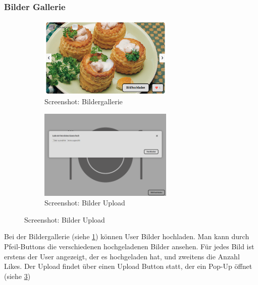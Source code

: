 \subsubsection*{Bilder Gallerie}

\begin{figure}[htp]
    \begin{subfigure}[b]{0.5\textwidth}
        \centering
        \includegraphics[width=0.7\textwidth]{images/Resultate_Bildergallerie.png}
        \caption{Screenshot: Bildergallerie}
        \label{fig:r-bildergallerie}
    \end{subfigure}
    \begin{subfigure}[b]{0.5\textwidth}
        \centering
        \includegraphics[width=0.7\textwidth]{images/Resultat_Bildergallerie_upload.png}
        \caption{Screenshot: Bilder Upload}
        \label{fig:r-bildpopup}
    \end{subfigure}
    \hfill
\end{figure}

Bei der Bildergallerie (siehe \ref{fig:r-bildergallerie}) können User Bilder
hochladen. Man kann durch Pfeil-Buttons die verschiedenen hochgeladenen Bilder
ansehen. Für jedes Bild ist erstens der User angezeigt, der es hochgeladen hat, und zweitens die
Anzahl Likes. Der Upload findet über einen Upload Button statt, der ein Pop-Up
öffnet (siehe \ref{fig:r-bildpopup})



